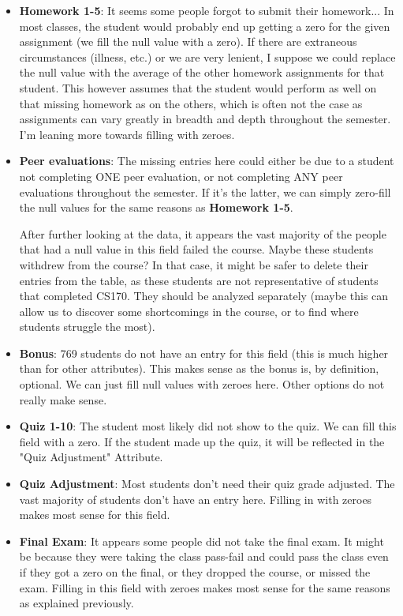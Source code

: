 \documentclass[12pt,letterpaper]{article}
\begin{document}
\begin{itemize}
    \item 
    \textbf{Homework 1-5}: It seems some people forgot to submit their homework... In most classes, the student would probably end up getting a zero for the given assignment (we fill the null value with a zero). If there are extraneous circumstances (illness, etc.) or we are very lenient, I suppose we could replace the null value with the average of the other homework assignments for that student. This however assumes that the student would perform as well on that missing homework as on the others, which is often not the case as assignments can vary greatly in breadth and depth throughout the semester. I'm leaning more towards filling with zeroes.
    \item
    \textbf{Peer evaluations}: The missing entries here could either be due to a student not completing ONE peer evaluation, or not completing ANY peer evaluations throughout the semester. If it's the latter, we can simply zero-fill the null values for the same reasons as \textbf{Homework 1-5}. 
    
    After further looking at the data, it appears the vast majority of the people that had a null value in this field failed the course. Maybe these students withdrew from the course? In that case, it might be safer to delete their entries from the table, as these students are not representative of students that completed CS170. They should be analyzed separately (maybe this can allow us to discover some shortcomings in the course, or to find where students struggle the most).
    \item
    \textbf{Bonus}: 769 students do not have an entry for this field (this is much higher than for other attributes). This makes sense as the bonus is, by definition, optional. We can just fill null values with zeroes here. Other options do not really make sense.
    \item
    \textbf{Quiz 1-10}: The student most likely did not show to the quiz. We can fill this field with a zero. If the student made up the quiz, it will be reflected in the "Quiz Adjustment" Attribute.
    \item
    \textbf{Quiz Adjustment}: Most students don't need their quiz grade adjusted. The vast majority of students don't have an entry here. Filling in with zeroes makes most sense for this field.
    \item
    \textbf{Final Exam}: It appears some people did not take the final exam. It might be because they were taking the class pass-fail and could pass the class even if they got a zero on the final, or they dropped the course, or missed the exam. Filling in this field with zeroes makes most sense for the same reasons as explained previously.
\end{itemize}
\end{document}
